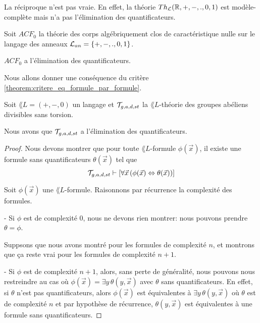 \documentclass[a4paper, 12pt]{report}
\begin{document}
\begin{remarque}
	La réciproque n'est pas vraie. En effet, la théorie $Th_{\mathcal{L}}(\mathbb{R}, +,
	-, ., 0, 1)$ est modèle-complète mais n'a pas l'élimination des
	quantificateurs.
\end{remarque}

\begin{exemple}
	Soit $ACF_{0}$ la théorie des corps algébriquement clos de caractéristique
	nulle sur le langage des anneaux $\mathcal{L}_{an} = \left\{ +, -, ., 0, 1 \right\}$.

	$ACF_{0}$ a l'élimination des quantificateurs.
\end{exemple}

Nous allons donner une conséquence du critère
\ref{theorem:critere_eq_formule_par_formule}.

\begin{proposition}
	Soit $\lang{L} = (+, -, 0)$ un langage et $\mathcal{T}_{g, a, d, st}$ la
	$\lang{L}$-théorie des groupes abéliens divisibles sans torsion.

	Nous avons que $\mathcal{T}_{g, a, d, st}$ a l'élimination des
	quantificateurs.
\end{proposition}

\ifdefined\outputproof
\begin{proof}
	Nous devons montrer que pour toute $\lang{L}$-formule $\phi(\vec{x})$, il existe une
	formule sans quantificateurs $\theta(\vec{x})$ tel que
	\begin{equation}
		\mathcal{T}_{g, a, d, st} \vdash [\forall \vec{x} \, (\phi(\vec{x})
		\Leftrightarrow \theta(\vec{x}))]
	\end{equation}

	Soit $\phi(\vec{x})$ une $\lang{L}$-formule.
	Raisonnons par récurrence la complexité des formules.

	- Si $\phi$ est de complexité $0$, nous ne devons rien montrer: nous pouvons
	prendre $\theta = \phi$.

	Suppsons que nous avons montré pour les formules de complexité $n$, et
	montrons que ça reste vrai pour les formules de complexité $n + 1$.

	- Si $\phi$ est de complexité $n + 1$, alors, sans perte de généralité, nous
	pouvons nous restreindre au cas où $\phi(\vec{x}) = \exists y \, \theta(y,
	\vec{x})$ avec $\theta$ sans quantificateurs.
	En effet, si $\theta$ n'est pas quantificateurs, alors $\phi(\vec{x})$ est
	équivalentes à $\exists y \, \theta(y, \vec{x})$ où $\theta$ est de
	complexité $n$ et par hypothèse de récurrence, $\theta(y, \vec{x})$ est
	équivalentes à une formule sans quantificateurs.

\end{proof}
\fi
\end{document}

